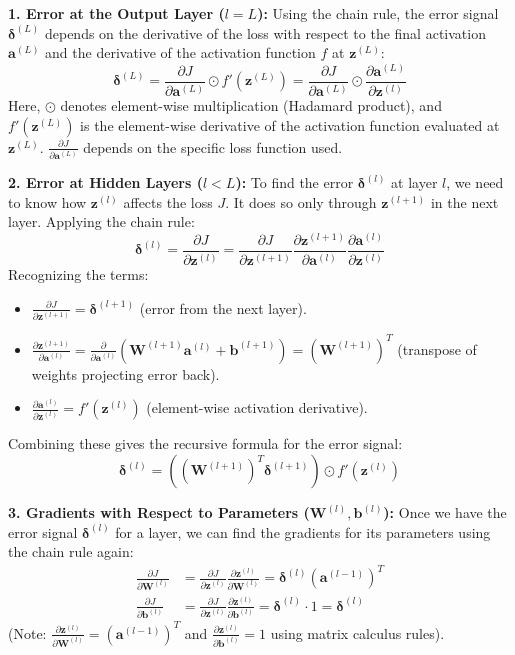 \documentclass{article}
\newcommand{\bW}{\bm{W}}
\newcommand{\bb}{\bm{b}}
\newcommand{\bz}{\bm{z}}
\newcommand{\ba}{\bm{a}}
\newcommand{\bdelta}{\bm{\delta}}
\begin{document}
\textbf{1. Error at the Output Layer ($l=L$):}
Using the chain rule, the error signal $\bdelta^{(L)}$ depends on the derivative of the loss with respect to the final activation $\ba^{(L)}$ and the derivative of the activation function $f$ at $\bz^{(L)}$:
\begin{equation} \label{eq:delta_L}
    \bdelta^{(L)} = \frac{\partial J}{\partial \ba^{(L)}} \odot f'(\bz^{(L)}) = \frac{\partial J}{\partial \ba^{(L)}} \odot \frac{\partial \ba^{(L)}}{\partial \bz^{(l)}}
\end{equation}
Here, $\odot$ denotes element-wise multiplication (Hadamard product), and $f'(\bz^{(L)})$ is the element-wise derivative of the activation function evaluated at $\bz^{(L)}$. $\frac{\partial J}{\partial \ba^{(L)}}$ depends on the specific loss function used.

\textbf{2. Error at Hidden Layers ($l < L$):}
To find the error $\bdelta^{(l)}$ at layer $l$, we need to know how $\bz^{(l)}$ affects the loss $J$. It does so only through $\bz^{(l+1)}$ in the next layer. Applying the chain rule:
\begin{equation}
    \bdelta^{(l)} = \frac{\partial J}{\partial \bz^{(l)}} = \frac{\partial J}{\partial \bz^{(l+1)}} \frac{\partial \bz^{(l+1)}}{\partial \ba^{(l)}} \frac{\partial \ba^{(l)}}{\partial \bz^{(l)}}
\end{equation}
Recognizing the terms:
\begin{itemize}
    \item $\frac{\partial J}{\partial \bz^{(l+1)}} = \bdelta^{(l+1)}$ (error from the next layer).
    \item $\frac{\partial \bz^{(l+1)}}{\partial \ba^{(l)}} = \frac{\partial}{\partial \ba^{(l)}} (\bW^{(l+1)} \ba^{(l)} + \bb^{(l+1)}) = (\bW^{(l+1)})^T$ (transpose of weights projecting error back).
    \item $\frac{\partial \ba^{(l)}}{\partial \bz^{(l)}} = f'(\bz^{(l)})$ (element-wise activation derivative).
\end{itemize}
Combining these gives the recursive formula for the error signal:
\begin{equation} \label{eq:delta_l}
    \bdelta^{(l)} = ((\bW^{(l+1)})^T \bdelta^{(l+1)}) \odot f'(\bz^{(l)})
\end{equation}

\textbf{3. Gradients with Respect to Parameters ($\bW^{(l)}, \bb^{(l)}$):}
Once we have the error signal $\bdelta^{(l)}$ for a layer, we can find the gradients for its parameters using the chain rule again:
\begin{align}
    \frac{\partial J}{\partial \bW^{(l)}} &= \frac{\partial J}{\partial \bz^{(l)}} \frac{\partial \bz^{(l)}}{\partial \bW^{(l)}} = \bdelta^{(l)} (\ba^{(l-1)})^T \label{eq:grad_W} \\
    \frac{\partial J}{\partial \bb^{(l)}} &= \frac{\partial J}{\partial \bz^{(l)}} \frac{\partial \bz^{(l)}}{\partial \bb^{(l)}} = \bdelta^{(l)} \cdot 1 = \bdelta^{(l)} \label{eq:grad_b}
\end{align}
(Note: $\frac{\partial \bz^{(l)}}{\partial \bW^{(l)}} = (\ba^{(l-1)})^T$ and $\frac{\partial \bz^{(l)}}{\partial \bb^{(l)}} = 1$ using matrix calculus rules).
\end{document}
